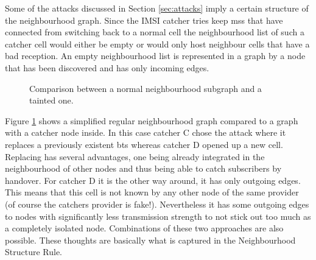 Some of the attacks discussed in Section \ref{sec:attacks} imply a certain structure of the neighbourhood graph.
Since the IMSI catcher tries keep \glspl{ms} that have connected from switching back to a normal cell the neighbourhood list of such a catcher cell would either be empty or would only host neighbour cells that have a bad reception.
An empty neighbourhood list is represented in a graph by a node that has been discovered and has only incoming edges.
\begin{figure}
\centering
{}
\caption{Comparison between a normal neighbourhood subgraph and a tainted one.}
\label{fig:structure_comparison}
\end{figure}
Figure \ref{fig:structure_comparison} shows a simplified regular neighbourhood graph compared to a graph with a catcher node inside.
In this case catcher C chose the attack where it replaces a previously existent \gls{bts} whereas catcher D opened up a new cell.
Replacing has several advantages, one being already integrated in the neighbourhood of other nodes and thus being able to catch subscribers by handover.
For catcher D it is the other way around, it has only outgoing edges.
This means that this cell is not known by any other node of the same provider (of course the catchers provider is fake!).
Nevertheless it has some outgoing edges to nodes with significantly less transmission strength to not stick out too much as a completely isolated node.
Combinations of these two approaches are also possible.
These thoughts are basically what is captured in the Neighbourhood Structure Rule.

